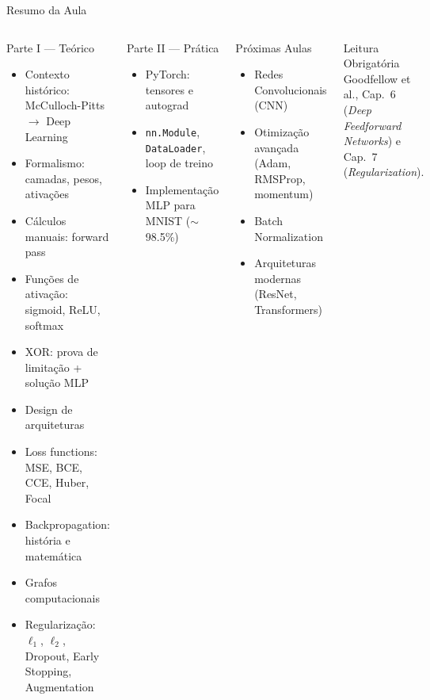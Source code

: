 \documentclass[7pt, aspectratio=169,10pt]{beamer}
\begin{document}

\begin{frame}{Resumo da Aula}
\begin{columns}[T]
\begin{block}{Parte I — Teórico}
\small
\begin{itemize}
  \item[\checkmark] Contexto histórico: McCulloch-Pitts $\to$ Deep Learning
  \item[\checkmark] Formalismo: camadas, pesos, ativações
  \item[\checkmark] Cálculos manuais: forward pass
  \item[\checkmark] Funções de ativação: sigmoid, ReLU, softmax
  \item[\checkmark] XOR: prova de limitação + solução MLP
  \item[\checkmark] Design de arquiteturas
  \item[\checkmark] Loss functions: MSE, BCE, CCE, Huber, Focal
  \item[\checkmark] Backpropagation: história e matemática
  \item[\checkmark] Grafos computacionais
  \item[\checkmark] Regularização: $\ell_1$, $\ell_2$, Dropout, Early Stopping, Augmentation
\end{itemize}
\end{block}
\begin{block}{Parte II — Prática}
\small
\begin{itemize}
  \item[\checkmark] PyTorch: tensores e autograd
  \item[\checkmark] \texttt{nn.Module}, \texttt{DataLoader}, loop de treino
  \item[\checkmark] Implementação MLP para MNIST ($\sim$98.5\%)
\end{itemize}
\end{block}
\begin{block}{Próximas Aulas}
\small
\begin{itemize}
  \item Redes Convolucionais (CNN)
  \item Otimização avançada (Adam, RMSProp, momentum)
  \item Batch Normalization
  \item Arquiteturas modernas (ResNet, Transformers)
\end{itemize}
\end{block}
\begin{alertblock}{Leitura Obrigatória}
\small
Goodfellow et al., Cap.\ 6 (\textit{Deep Feedforward Networks}) e Cap.\ 7 (\textit{Regularization}).
\end{alertblock}
\end{columns}
\end{frame}
\end{document}
